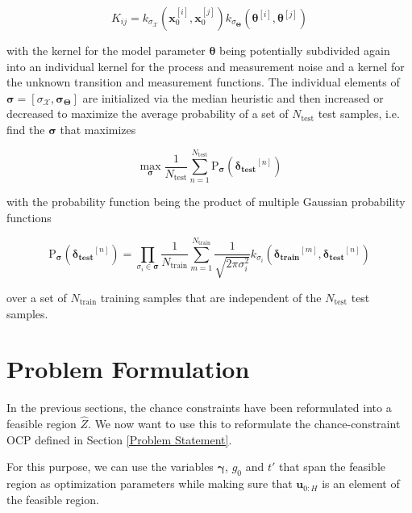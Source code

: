 \begin{equation} \label{Kernel equation}
K_{ij} = k_{\sigma_\mathcal{X}}(\boldsymbol{x}_0^{[i]}, \boldsymbol{x}_0^{[j]}) k_{\sigma_{\boldsymbol{\Theta}}}(\boldsymbol{\theta}^{[i]}, \boldsymbol{\theta}^{[j]})
\end{equation}

with the kernel for the model parameter $\boldsymbol{\theta}$ being potentially subdivided again into an individual kernel for the process and measurement noise and a kernel for the unknown transition and measurement functions. The individual elements of $\boldsymbol{\sigma} = [\sigma_\mathcal{X}, \boldsymbol{\sigma}_{\boldsymbol{\Theta}}]$ are initialized via the median heuristic \cite{Damien_18} and then increased or decreased to maximize the average probability of a set of $N_\text{test}$ test samples, i.e. find the $\boldsymbol{\sigma}$ that maximizes

 \begin{equation} \label{Average Probability}
\max\limits_{\boldsymbol{\sigma}} \frac{1}{N_\text{test}}  \sum_{n= 1}^{N_\text{test}} \text{P}_{\boldsymbol{\sigma}} ( \boldsymbol{\delta_\text{test}}^{[n]} )
\end{equation}

with the probability function being the product of multiple Gaussian probability functions 

 \begin{equation} \label{Gaussian Probability}
\text{P}_{\boldsymbol{\sigma}} ( \boldsymbol{\delta_\text{test}}^{[n]} ) = \prod_{\sigma_i \in \boldsymbol{\sigma}} \frac{1}{N_\text{train}} \sum_{m = 1}^{N_\text{train}} \frac{1}{\sqrt{2 \pi \sigma_i^2}} k_{\sigma_i}(\boldsymbol{\delta_\text{train}}^{[m]} ,\boldsymbol{\delta_\text{test}}^{[n]})
\end{equation}

over a set of $N_\text{train}$ training samples that are independent of the $N_\text{test}$ test samples.


\section{Problem Formulation} \label{Problem Formulation}

In the previous sections, the chance constraints have been reformulated into a feasible region $\hat{Z}$. We now want to use this to reformulate the chance-constraint OCP defined in Section \ref{Problem Statement}. 

For this purpose, we can use the variables $\boldsymbol{\gamma}$, $g_0$ and $t'$ that span the feasible region as optimization parameters while making sure that $\boldsymbol{u}_{0:H}$ is an element of the feasible region.

